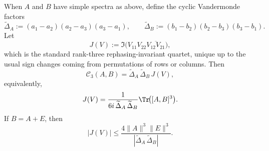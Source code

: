 \documentclass[12pt,a4paper]{article}
\begin{document}
\begin{proposition}
\label{p4:prop:rank-three-jarlskog-identity}
When $A$ and $B$ have simple spectra as above, define the cyclic Vandermonde factors
\[
\widetilde\Delta_A:=(a_1-a_2)(a_2-a_3)(a_3-a_1),
\qquad
\widetilde\Delta_B:=(b_1-b_2)(b_2-b_3)(b_3-b_1).
\]
Let
\[
J(V):=\Im\!\bigl(V_{11}V_{22}\overline{V_{12}V_{21}}\bigr),
\]
which is the standard rank-three rephasing-invariant quartet, unique up to the usual sign changes coming from permutations of rows or columns.
Then
\begin{equation}
\label{p4:eq:rank-three-jarlskog-identity}
\mathcal C_3(A,B)=\widetilde\Delta_A\,\widetilde\Delta_B\,J(V),
\end{equation}
equivalently,
\begin{equation}
\label{p4:eq:rank-three-jarlskog-normalized}
J(V)=\frac{1}{6i\,\widetilde\Delta_A\,\widetilde\Delta_B}\Tr\!\bigl([A,B]^3\bigr).
\end{equation}
If $B=A+E$, then
\begin{equation}
\label{p4:eq:rank-three-jarlskog-perturbative-bound}
|J(V)|
\le
\frac{4\|A\|^3\|E\|^3}{|\widetilde\Delta_A\,\widetilde\Delta_B|}.
\end{equation}
\end{proposition}
\end{document}
